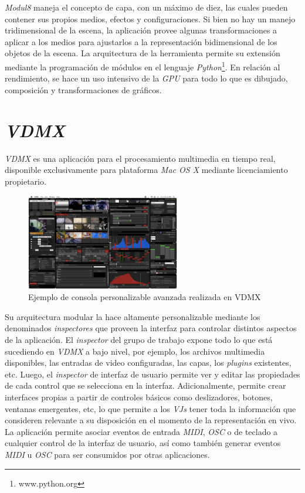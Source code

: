 \emph{Modul8} maneja el concepto de capa, con un máximo de diez, las cuales pueden contener sus propios medios, efectos y configuraciones.
Si bien no hay un manejo tridimensional de la escena, la aplicación provee algunas transformaciones a aplicar a los medios para ajustarlos a la representación bidimensional de los objetos de la escena.
La arquitectura de la herramienta permite su extensión mediante la programación de módulos en el lenguaje \emph{Python}\footnote{www.python.org}.
En relación al rendimiento, se hace un uso intensivo de la \emph{GPU} para todo lo que es dibujado, composición y transformaciones de gráficos.

\section{\emph{VDMX}}
\emph{VDMX}\cite{VDMX} es una aplicación para el procesamiento multimedia en tiempo real, disponible exclusivamente para plataforma \emph{Mac OS X} mediante licenciamiento propietario.

\begin{figure}[H]
  \centering
    \includegraphics[width=0.6\textwidth]{./Apendices/Cap3_aplicaciones/apps-vdmx.png}
  \caption[http://vidvox.net]{Ejemplo de consola personalizable avanzada realizada en VDMX} %
  \label{fig:Apps-VDMX}
\end{figure}

Su arquitectura modular la hace altamente personalizable mediante los denominados \emph{inspectores} que proveen la interfaz para controlar distintos aspectos de la aplicación. El \emph{inspector} del grupo de trabajo expone todo lo que está sucediendo en \emph{VDMX} a bajo nivel, por ejemplo, los archivos multimedia disponibles, las entradas de video configuradas, las capas, los \emph{plugins} existentes, etc. Luego, el \emph{inspector} de interfaz de usuario permite ver y editar las propiedades de cada control que se selecciona en la interfaz. Adicionalmente, permite crear interfaces propias a partir de controles básicos como deslizadores, botones, ventanas emergentes, etc, lo que permite a los \emph{VJs} tener toda la información que consideren relevante a su disposición en el momento de la representación en vivo.
La aplicación permite asociar eventos de entrada \emph{MIDI}, \emph{OSC} o de teclado a cualquier control de la interfaz de usuario, así como también generar eventos \emph{MIDI} u \emph{OSC} para ser consumidos por otras aplicaciones.

